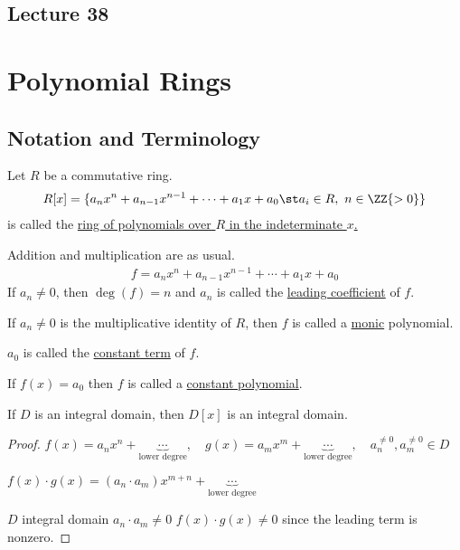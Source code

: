 \documentclass[a4paper]{article}
\begin{document}
\subsection*{Lecture 38} %
\section{Polynomial Rings}
\subsection{Notation and Terminology}
\begin{definition}
  Let \( R \) be a commutative ring.
  \begin{align*}
    R[x] = \{a_nx^n + a_{n-1}x^{n-1} + \cdots + a_1x+a_0 \st a_i\in R,\ n\in\ZZ{>0}\}
  \end{align*}
  is called the \ul{ring of polynomials over \( R \) in the indeterminate \( x \).}
\end{definition}

Addition and multiplication are as usual.
\begin{align*}
  f=a_nx^n + a_{n-1}x^{n-1} + \cdots + a_1x+a_0
\end{align*}
If \( a_n\neq 0 \), then \ul{\( \deg(f) = n \)} and \( a_n \) is called the \ul{leading coefficient} of \( f \).

If \( a_n\neq 0 \) is the multiplicative identity of \( R \), then \( f \) is called a \ul{monic} polynomial.

\( a_0 \) is called the \ul{constant term} of \( f \).

If \( f(x) = a_0 \) then \( f \) is called a \ul{constant polynomial}.

\begin{theorem}
  If \( D \) is an integral domain, then \( D[x] \) is an integral domain.
\end{theorem}

\begin{proof}
  \( f(x) = a_nx^n+\underbrace{\cdots}_{\text{lower degree}},\quad g(x) = a_mx^m + \underbrace{\cdots}_{\text{lower degree}},\quad a_n^{\neq 0}, a_m^{\neq 0} \in D \)

  \( f(x)\cdot g(x) =  (a_n \cdot a_m)x^{m+n} + \underbrace{\cdots}_{\text{lower degree}} \)

  \( D \) integral domain \imp \( a_n\cdot a_m \neq 0 \) \imp \( f(x)\cdot g(x)\neq 0 \) since the leading term is nonzero.
\end{proof}
\end{document}
